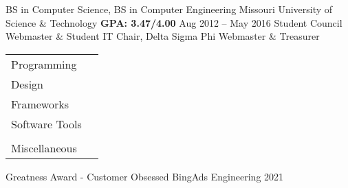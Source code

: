 \documentclass[]{awesome-cv}
\begin{document}
\begin{cventries}
	\cventry
	{BS in Computer Science, BS in Computer Engineering}
	{Missouri University of Science \& Technology}
	{\bfseries GPA: 3.47/4.00}
	{Aug 2012 – May 2016}
	{Student Council Webmaster \& Student IT Chair, Delta Sigma Phi Webmaster \& Treasurer} %
\end{cventries}

\vspace*{0mm}

\begin{cventries}
	\cventry
	{\def\arraystretch{1.5}{\begin{tabular}{ l l}
		Programming  & {\skill{ JS/Typescript, C\#, C++, T-SQL}} \\
		Design  & {\skill{ HTML, CSS, Markdown, \LaTeX}} \\
		Frameworks  & {\skill{ React, Redux, Knockout, web components}} \\
		Software Tools  & {\skill{ Git, Powershell, Bash}} \\ \\
		Miscellaneous  & {\skill{ MS Office, Android, Windows, Linux, Azure DevOps, GitHub}} \\
		\end{tabular}}}
	{}
	{}
	{}
	{}
\end{cventries}
\vspace{-6mm}

\begin{cvhonors}
	\cvhonor
	{Greatness Award - Customer Obsessed}
	{BingAds Engineering}
	{}
	{2021}
\end{cvhonors}
\end{document}
